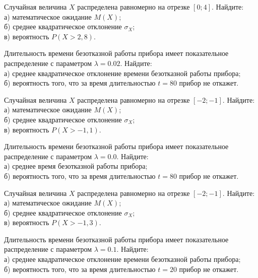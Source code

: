 \vfill

\newpage\setcounter{zad}{0}

\z Случайная величина $X$ распределена равномерно на отрезке $[0; 4]$. Найдите: \\ \quad а) математическое ожидание $M(X)$; \\ \quad б) среднее квадратическое отклонение $\sigma_X$; \\ \quad в) вероятность $P(X>2{,}8)$.


\vfill

\z Длительность времени безотказной работы прибора имеет показательное распределение с параметром $\lambda = 0.02$. Найдите: \\ \quad а) среднее квадратическое отклонение времени безотказной работы прибора; \\ \quad б) вероятность того, что за время длительностью $t = 80$ прибор не откажет.
 

\vfill

\newpage\setcounter{zad}{0}

\z Случайная величина $X$ распределена равномерно на отрезке $[-2; -1]$. Найдите: \\ \quad а) математическое ожидание $M(X)$; \\ \quad б) среднее квадратическое отклонение $\sigma_X$; \\ \quad в) вероятность $P(X>-1{,}1)$.


\vfill

\z Длительность времени безотказной работы прибора имеет показательное распределение с параметром $\lambda = 0.0$. Найдите: \\ \quad а) среднее время безотказной работы прибора; \\ \quad б) вероятность того, что за время длительностью $t = 80$ прибор не откажет.
 

\vfill

\newpage\setcounter{zad}{0}

\z Случайная величина $X$ распределена равномерно на отрезке $[-2; -1]$. Найдите: \\ \quad а) математическое ожидание $M(X)$; \\ \quad б) среднее квадратическое отклонение $\sigma_X$; \\ \quad в) вероятность $P(X>-1{,}3)$.


\vfill

\z Длительность времени безотказной работы прибора имеет показательное распределение с параметром $\lambda = 0.1$. Найдите: \\ \quad а) среднее квадратическое отклонение времени безотказной работы прибора; \\ \quad б) вероятность того, что за время длительностью $t = 20$ прибор не откажет.
 

